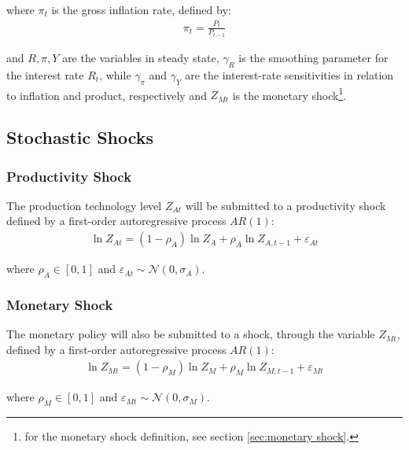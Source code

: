 \documentclass[
	12pt, 
	]{article}
\numberwithin{equation}{section}
\theoremstyle{definition}
\theoremstyle{plain}
\theoremstyle{plain}
\theoremstyle{plain}
\begin{document}
where $\pi_t$ is the gross inflation rate, defined by:
\begin{align}
	\pi_t = \frac{P_t}{P_{t-1}}
	\label{eq:gross-inflation-rate}
\end{align}

and $R, \pi, Y$ are the variables in steady state, $\gamma_R$ is the smoothing parameter for the interest rate $R_t$, while $\gamma_\pi$ and $\gamma_Y$ are the interest-rate sensitivities in relation to inflation and product, respectively and $Z_{Mt}$ is the monetary shock\footnote{for the monetary shock definition, see section \ref{sec:monetary shock}.}.


\subsection{Stochastic Shocks}\label{sec:stochastic-shocks}

\subsubsection*{Productivity Shock} \label{sec:productivity shock}

The production technology level $Z_{At}$ will be submitted to a productivity shock defined by a first-order autoregressive process $AR(1)$:
\begin{align}
	\ln{Z_{At}} = (1-\rho_A)\ln{Z_A} + \rho_A\ln{Z_{A,t-1}} + \varepsilon_{At} \label{eq:productivity-shock}
\end{align}

where $\rho_A \in [0,1]$ and $\varepsilon_{At} \sim \mathscr{N}(0,\sigma_A)$.

\subsubsection*{Monetary Shock} \label{sec:monetary shock}

The monetary policy will also be submitted to a shock, through the variable $Z_{Mt}$, defined by a first-order autoregressive process $AR(1)$:
\begin{align}
	\ln{Z_{Mt}} = (1-\rho_M)\ln{Z_{M}} + \rho_M\ln{Z_{M,t-1}} + \varepsilon_{Mt} \label{eq:monetary-shock}
\end{align}

where $\rho_M \in [0,1]$ and $\varepsilon_{Mt} \sim \mathscr{N}(0,\sigma_M)$.
\end{document}
